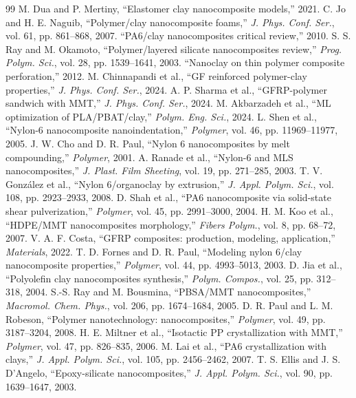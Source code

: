\documentclass[conference]{IEEEtran}
\begin{document}
\begin{thebibliography}{99}
 M. Dua and P. Mertiny, ``Elastomer clay nanocomposite models,'' 2021.
 C. Jo and H. E. Naguib, ``Polymer/clay nanocomposite foams,'' \emph{J. Phys. Conf. Ser.}, vol. 61, pp. 861--868, 2007.
 ``PA6/clay nanocomposites critical review,'' 2010.
 S. S. Ray and M. Okamoto, ``Polymer/layered silicate nanocomposites review,'' \emph{Prog. Polym. Sci.}, vol. 28, pp. 1539--1641, 2003.
 ``Nanoclay on thin polymer composite perforation,'' 2012.
 M. Chinnapandi et al., ``GF reinforced polymer-clay properties,'' \emph{J. Phys. Conf. Ser.}, 2024.
 A. P. Sharma et al., ``GFRP-polymer sandwich with MMT,'' \emph{J. Phys. Conf. Ser.}, 2024.
 M. Akbarzadeh et al., ``ML optimization of PLA/PBAT/clay,'' \emph{Polym. Eng. Sci.}, 2024.
 L. Shen et al., ``Nylon-6 nanocomposite nanoindentation,'' \emph{Polymer}, vol. 46, pp. 11969--11977, 2005.
 J. W. Cho and D. R. Paul, ``Nylon 6 nanocomposites by melt compounding,'' \emph{Polymer}, 2001.
 A. Ranade et al., ``Nylon-6 and MLS nanocomposites,'' \emph{J. Plast. Film Sheeting}, vol. 19, pp. 271--285, 2003.
 T. V. Gonz\'{a}lez et al., ``Nylon 6/organoclay by extrusion,'' \emph{J. Appl. Polym. Sci.}, vol. 108, pp. 2923--2933, 2008.
 D. Shah et al., ``PA6 nanocomposite via solid-state shear pulverization,'' \emph{Polymer}, vol. 45, pp. 2991--3000, 2004.
 H. M. Koo et al., ``HDPE/MMT nanocomposites morphology,'' \emph{Fibers Polym.}, vol. 8, pp. 68--72, 2007.
 V. A. F. Costa, ``GFRP composites: production, modeling, application,'' \emph{Materials}, 2022.
 T. D. Fornes and D. R. Paul, ``Modeling nylon 6/clay nanocomposite properties,'' \emph{Polymer}, vol. 44, pp. 4993--5013, 2003.
 D. Jia et al., ``Polyolefin clay nanocomposites synthesis,'' \emph{Polym. Compos.}, vol. 25, pp. 312--318, 2004.
 S.-S. Ray and M. Bousmina, ``PBSA/MMT nanocomposites,'' \emph{Macromol. Chem. Phys.}, vol. 206, pp. 1674--1684, 2005.
 D. R. Paul and L. M. Robeson, ``Polymer nanotechnology: nanocomposites,'' \emph{Polymer}, vol. 49, pp. 3187--3204, 2008.
 H. E. Miltner et al., ``Isotactic PP crystallization with MMT,'' \emph{Polymer}, vol. 47, pp. 826--835, 2006.
 M. Lai et al., ``PA6 crystallization with clays,'' \emph{J. Appl. Polym. Sci.}, vol. 105, pp. 2456--2462, 2007.
 T. S. Ellis and J. S. D'Angelo, ``Epoxy-silicate nanocomposites,'' \emph{J. Appl. Polym. Sci.}, vol. 90, pp. 1639--1647, 2003.

\end{thebibliography}
\end{document}
